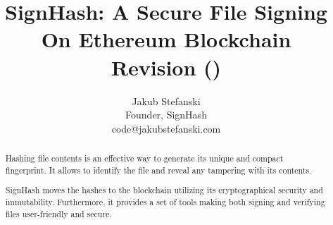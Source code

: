 \documentclass[9pt,oneside]{amsart}
\title{
	SignHash: A Secure File Signing On Ethereum Blockchain \\
	{\smaller \textbf{Revision (\WhitePaperVersionNumber{})}}
}
\author{
	Jakub Stefanski\\
	Founder, SignHash\\
	code@jakubstefanski.com
}
\begin{document}
\begin{abstract}

Hashing file contents is an effective way to generate its unique and compact fingerprint.
It allows to identify the file and reveal any tampering with its contents.

SignHash moves the hashes to the blockchain utilizing its cryptographical security and immutability.
Furthermore, it provides a set of tools making both signing and verifying files user-friendly and secure.

\end{abstract}

\maketitle

\setlength{\columnsep}{20pt}
\end{document}
